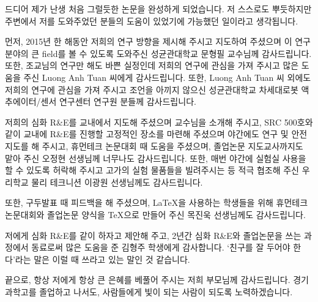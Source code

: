 \clearpage
\begin{onehalfspace} %
	
	
\end{onehalfspace}



\begin{acknowledgements}
드디어 제가 난생 처음 그럴듯한 논문을 완성하게 되었습니다. 저 스스로도 뿌듯하지만 주변에서 저를 도와주었던 분들의 도움이 있었기에 가능했던 일이라고 생각됩니다.

먼저, 2015년 한 해동안 저희의 연구 방향을 제시해 주시고 지도하여 주셨으며 이 연구 분야의 큰 field를 볼 수 있도록 도와주신 성균관대학교 문형필 교수님께 감사드립니다. 또한, 조교님의 연구만 해도 바쁜 실정인데 저희의 연구에 관심을 가져 주시고 많은 도움을 주신 Luong Anh Tuan 씨에게 감사드립니다. 또한, Luong Anh Tuan 씨 외에도 저희의 연구에 관심을 가져 주시고 조언을 아끼지 않으신 성균관대학교 차세대로봇 액추에이터/센서 연구센터 연구원 분들께 감사드립니다.

저희의 심화 R\&E를 교내에서 지도해 주셨으며 교수님을 소개해 주시고, SRC 500호와 같이 교내에 R\&E를 진행할 고정적인 장소를 마련해 주셨으며 야간에도 연구 및 안전 지도를 해 주시고, 휴먼테크 논문대회 때 도움을 주셨으며, 졸업논문 지도교사까지도 맡아 주신 오정현 선생님께 너무나도 감사드립니다. 또한, 매번 야간에 실험실 사용을 할 수 있도록 허락해 주시고 고가의 실험 물품들을 빌려주시는 등 적극 협조해 주신 우리학교 물리 테크니션 이광원 선생님께도 감사드립니다.

또한, 구두발표 때 피드백을 해 주셨으며, \LaTeX 을 사용하는 학생들을 위해 휴먼테크논문대회와 졸업논문 양식을 \TeX 으로 만들어 주신 목진욱 선생님께도 감사드립니다. %

저에게 심화 R\&E를 같이 하자고 제안해 주고, 2년간 심화 R\&E와 졸업논문을 쓰는 과정에서 동료로써 많은 도움을 준 김형주 학생에게 감사합니다. 
`친구를 잘 두어야 한다'라는 말은 이럴 때 쓰라고 있는 말인 것 같습니다.

끝으로, 항상 저에게 항상 큰 은혜를 베풀어 주시는 저희 부모님께 감사드립니다. 경기과학고를 졸업하고 나서도, 사람들에게 빛이 되는 사람이 되도록 노력하겠습니다.
\end{acknowledgements}

